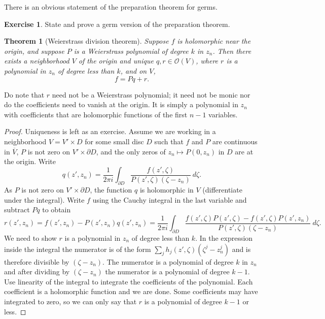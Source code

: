 \documentclass[12pt,openany]{book}
\newcommand{\sO}{{\mathscr{O}}}
\newcommand{\myindex}[1]{#1\index{#1}}
\theoremstyle{plain}
\newtheorem{thm}{Theorem}[section]
\theoremstyle{remark}
\theoremstyle{definition}
\newenvironment{exbox}{%
    \def\FrameCommand{\vrule width 1pt \relax\hspace {10pt}}%
    \MakeFramed {\advance \hsize -\width \FrameRestore }%
}{%
    \endMakeFramed
}
\theoremstyle{exercise}
\newtheorem{exercise}{Exercise}[section]
\theoremstyle{example}
\begin{document}
There is an obvious statement of the preparation theorem for germs.

\begin{exbox}
\begin{exercise}
State and prove a germ version of the preparation theorem.
\end{exercise}
\end{exbox}

\begin{thm}[\myindex{Weierstrass division theorem}]
Suppose $f$ is holomorphic near the origin, and suppose $P$
is a Weierstrass polynomial of degree $k$ in $z_n$.  Then there exists
a neighborhood $V$ of the origin and unique $q,r \in \sO(V)$,
where $r$ is a polynomial in $z_n$ of degree less than $k$, and on $V$,
\begin{equation*}
f = Pq + r .
\end{equation*}
\end{thm}

Do note that $r$ need not be a Weierstrass polynomial; it need not be monic
nor do the coefficients need to vanish at the origin.  It is simply a
polynomial in $z_n$ with coefficients that are holomorphic functions
of the first $n-1$ variables.

\begin{proof}
Uniqueness is left as an exercise.  Assume we are working
in a neighborhood $V = V' \times D$ for some small disc $D$
such that $f$ and $P$ are continuous in $\overline{V}$,
$P$ is not zero on $V' \times \partial D$, and the
only zeros of $z_n \mapsto P(0,z_n)$ in $D$ are at the origin.  Write
\begin{equation*}
q(z',z_n) =
\frac{1}{2\pi i} \int_{\partial D} \frac{f(z',\zeta)}{P(z',\zeta)(\zeta-z_n)}
~d\zeta .
\end{equation*}
As $P$ is not zero on $V' \times \partial D$,
the function $q$ 
is holomorphic in $V$ (differentiate under the integral). 
Write $f$ using the Cauchy integral in the last variable and
subtract $Pq$ to obtain
\begin{equation*}
r(z',z_n) = f(z',z_n) - P(z',z_n)q(z',z_n)
=
\frac{1}{2\pi i}
\int_{\partial D} \frac{f(z',\zeta)P(z',\zeta) - f(z',\zeta)P(z',z_n)}{P(z',\zeta)(\zeta-z_n)}
~d\zeta .
\end{equation*}
We need to show $r$ is a polynomial in $z_n$ of degree less than
$k$.  In the expression inside the integral the numerator is
of the form $\sum_j h_j(z',\zeta)(\zeta^j-z_n^j)$ and is therefore
divisible by $(\zeta-z_n)$.
The numerator is a polynomial of degree $k$ in
$z_n$ and after dividing by $(\zeta-z_n)$
the numerator is a polynomial of degree $k-1$.
Use linearity of the integral
to integrate the coefficients of the polynomial.  Each coefficient is a
holomorphic function and we are done.  Some coefficients may have
integrated to zero, so we can only say that $r$ is a polynomial
of degree $k-1$ or less.
\end{proof}
\end{document}
